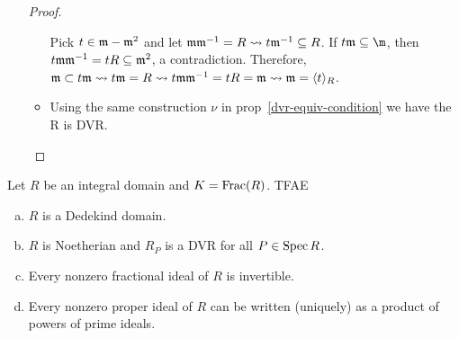 \begin{prop}
\begin{enumerate}
\begin{proof}
\begin{itemize}
            Pick $t \in \mathfrak{m} - \mathfrak{m}^2$ and let $\mathfrak{m}\mathfrak{m}^{-1} = R \leadsto t\mathfrak{m}^{-1}
            \subseteq R$. If $t\mf \subseteq \m$, then $t\mathfrak{m}\mathfrak{m}^{-1} = tR \subseteq
            \mathfrak{m}^{2}$, a contradiction. Therefore, $\mathfrak{m} \subset t\mathfrak{m} \leadsto t\mathfrak{m} 
            = R \leadsto t\mathfrak{m}\mathfrak{m}^{-1} = tR = \mathfrak{m} \leadsto \mathfrak{m} = \langle t\rangle_R$. 
          \item Using the same construction $\nu$ in prop~\ref{dvr-equiv-condition}
            we have the R is DVR.
        \end{itemize}
      \end{proof}
  \end{enumerate}
\end{prop}

\begin{theorem}
  Let $R$ be an integral domain and $K= \operatorname{Frac}(R)$. TFAE
  \begin{enumerate}[(a)]
    \item $R$ is a Dedekind domain.
    \item $R$ is Noetherian and $R_P$ is a DVR for all $P \in \operatorname{Spec} R$.
    \item Every nonzero fractional ideal of $R$ is invertible.
    \item Every nonzero proper ideal of $R$ can be written (uniquely) as a
      product of powers of prime ideals.
  \end{enumerate}


\end{theorem}
